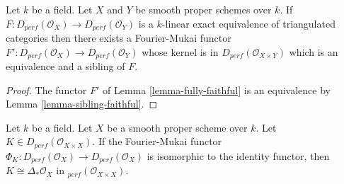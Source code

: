 \begin{proposition}
\label{proposition-equivalence}
Let $k$ be a field. Let $X$ and $Y$ be smooth proper schemes over $k$.
If $F : D_{perf}(\mathcal{O}_X) \to D_{perf}(\mathcal{O}_Y)$
is a $k$-linear exact equivalence of triangulated categories then
there exists a Fourier-Mukai functor
$F' : D_{perf}(\mathcal{O}_X) \to D_{perf}(\mathcal{O}_Y)$ whose
kernel is in $D_{perf}(\mathcal{O}_{X \times Y})$
which is an equivalence and a sibling of $F$.
\end{proposition}

\begin{proof}
The functor $F'$ of Lemma \ref{lemma-fully-faithful}
is an equivalence by Lemma \ref{lemma-sibling-faithful}.
\end{proof}

\begin{lemma}
\label{lemma-uniqueness}
Let $k$ be a field. Let $X$ be a smooth proper scheme over $k$.
Let $K \in D_{perf}(\mathcal{O}_{X \times X})$. If the Fourier-Mukai
functor $\Phi_K : D_{perf}(\mathcal{O}_X) \to D_{perf}(\mathcal{O}_X)$
is isomorphic to the identity functor, then
$K \cong \Delta_*\mathcal{O}_X$ in $_{perf}(\mathcal{O}_{X \times X})$.
\end{lemma}

